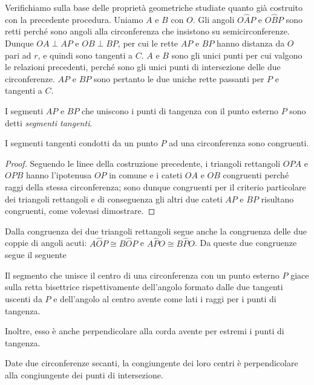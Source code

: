 Verifichiamo sulla base delle proprietà geometriche studiate quanto già 
costruito con la precedente procedura.
Uniamo $A$ e $B$ con $O$. Gli angoli $O\widehat{A}P$ e $O\widehat{B}P$ sono 
retti perché sono angoli alla circonferenza che 
insistono su semicirconferenze. Dunque $OA\perp AP$ e $OB\perp BP$, 
per cui le rette $AP$ e $BP$ hanno distanza da $O$ pari ad $r$, e 
quindi sono tangenti a $C$. $A$ e $B$ sono gli unici punti per cui 
valgono le relazioni precedenti, perché sono gli unici punti di 
intersezione delle due circonferenze. $AP$ e $BP$ sono pertanto le 
due uniche rette passanti per $P$ e tangenti a $C$.

I segmenti $AP$ e $BP$ che uniscono i punti di tangenza con il punto 
esterno $P$ sono detti \emph{segmenti tangenti}.

\begin{teorema}
I segmenti tangenti condotti da un punto $P$ ad una circonferenza 
sono congruenti.
\end{teorema}

\begin{proof}
Seguendo le linee della costruzione precedente, i triangoli 
rettangoli $OPA$ e $OPB$ hanno l'ipotenusa $OP$ in comune e i cateti 
$OA$ e $OB$ congruenti perché raggi della stessa circonferenza; sono 
dunque congruenti per il criterio particolare dei triangoli 
rettangoli e di conseguenza gli altri due cateti $AP$ e $BP$ 
risultano congruenti, come volevasi dimostrare.
\end{proof}

Dalla congruenza dei due triangoli rettangoli segue anche la 
congruenza delle due coppie di angoli acuti: $A\widehat{O}P\cong 
B\widehat{O}P$ e $A\widehat{P}O\cong B\widehat{P}O$. Da queste due 
congruenze segue il seguente 
\begin{corollario}\label{cor:5.1}
Il segmento che unisce il centro di una circonferenza con un punto 
esterno $P$ giace sulla retta bisettrice rispettivamente dell'angolo formato dalle due tangenti 
uscenti da $P$ e dell'angolo al centro avente come lati i raggi per 
i punti di tangenza.
\end{corollario}
Inoltre, esso è anche perpendicolare alla corda avente per estremi i 
punti di tangenza.

\begin{corollario}
Date due circonferenze secanti, la congiungente dei loro centri è 
perpendicolare alla congiungente dei punti di intersezione.
\end{corollario}


